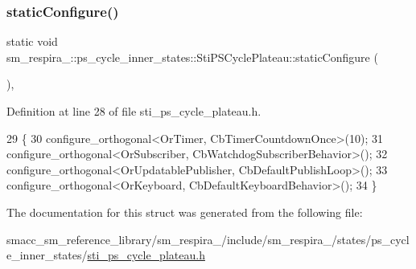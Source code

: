 \subsubsection{\texorpdfstring{static\+Configure()}{staticConfigure()}}
{\footnotesize\ttfamily static void sm\+\_\+respira\+\_\+::ps\+\_\+cycle\+\_\+inner\+\_\+states\+::\+Sti\+P\+S\+Cycle\+Plateau\+::static\+Configure (\begin{DoxyParamCaption}{ }\end{DoxyParamCaption})\hspace{0.3cm}{\ttfamily [inline]}, {\ttfamily [static]}}



Definition at line 28 of file sti\+\_\+ps\+\_\+cycle\+\_\+plateau.\+h.


\begin{DoxyCode}
29   \{
30     configure\_orthogonal<OrTimer, CbTimerCountdownOnce>(10);
31     configure\_orthogonal<OrSubscriber, CbWatchdogSubscriberBehavior>();
32     configure\_orthogonal<OrUpdatablePublisher, CbDefaultPublishLoop>();
33     configure\_orthogonal<OrKeyboard, CbDefaultKeyboardBehavior>();
34   \}
\end{DoxyCode}


The documentation for this struct was generated from the following file\+:\begin{DoxyCompactItemize}
\item 
smacc\+\_\+sm\+\_\+reference\+\_\+library/sm\+\_\+respira\+\_/include/sm\+\_\+respira\+\_/states/ps\+\_\+cycle\+\_\+inner\+\_\+states/\hyperlink{sti__ps__cycle__plateau_8h}{sti\+\_\+ps\+\_\+cycle\+\_\+plateau.\+h}\end{DoxyCompactItemize}

